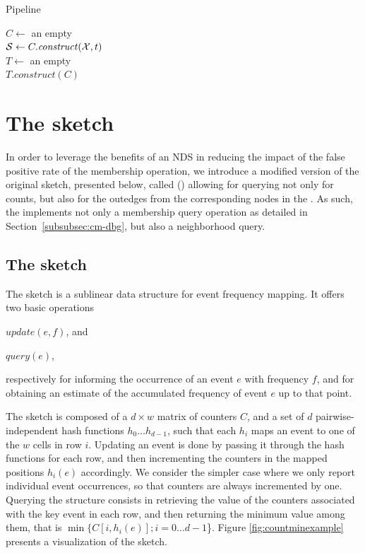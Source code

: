 \begin{algorithm}
  \caption{Pipeline}\label{alg:pipeline}
  $C \gets$ an empty \dBCM\\
  $\strsetname{S} \gets C.\mathit{construct}(\readset, t)$\\
  $T \gets$ an empty \dBHT\\
  $T.\mathit{construct}(C)$\\
\end{algorithm}


\section{The \dB\cm sketch}
\label{sec:debruijncountmin}

In order to leverage the benefits of an NDS in reducing the impact of the false positive rate of the membership operation, we introduce a modified version of the original \cm sketch, presented below, called \keyterm{\dB\cm} (\dBCM) allowing for querying not only for \kmer counts, but also for the outedges from the corresponding nodes in the \dBG. As such, the \dBCM implements not only a membership query operation as detailed in Section~\ref{subsubsec:cm-dbg}, but also a neighborhood query.



\subsection{The \cm sketch}
\label{sec:countmin}

The \cm sketch \cite{Cormode2005} is a sublinear data structure for event frequency mapping.
It offers two basic operations
\begin{compactenum}
\item $update(e, f)$, and
\item $query(e)$,
\end{compactenum}
respectively for informing the occurrence of an event $e$ with frequency $f$, and for obtaining an estimate of the accumulated frequency of event $e$ up to that point.

The sketch is composed of a $d\times w$ matrix of counters $C$, and a set of $d$ pairwise-independent hash functions $h_0\ldots h_{d-1}$, such that each $h_i$ maps an event to one of the $w$ cells in row $i$.
Updating an event is done by passing it through the hash functions for each row, and then incrementing the counters in
the mapped positions $h_i(e)$ accordingly. 
We consider the simpler case where we only report individual event occurrences, so that counters are always incremented by one.
Querying the structure consists in retrieving the value of the counters associated with the key event in each row,  and then returning
the minimum value among them, that is $\min\{C[i,h_i(e)]; i=0\ldots d-1$\}.
Figure \ref{fig:countminexample} presents a visualization of the \cm sketch.

